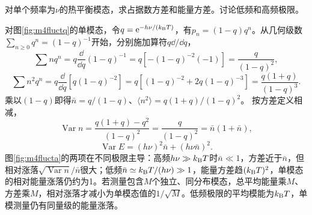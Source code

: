 \begin{example}\label{ex:m4fluctuation}
对单个频率为$\nu$的热平衡模态，求占据数方差和能量方差。讨论低频和高频极限。
\end{example}
\begin{solution}
对图\ref{fig:m4fluctq}的单模态，令$q=\mathrm e^{-h\nu/(k_{\mathrm B} T)}$，有$p_n=(1-q)q^n$。从几何级数$\sum_{n\geq0}q^n=(1-q)^{-1}$开始，分别施加算符$q\dd/\dd q$，
\[
 \sum nq^n=q\frac{\dd}{\dd q}(1-q)^{-1}
 =q[-(1-q)^{-2}(-1)]=\frac q{(1-q)^2},
\]
\[
 \sum n^2q^n=q\frac{\dd}{\dd q}[q(1-q)^{-2}]
 =q[(1-q)^{-2}+2q(1-q)^{-3}]
 =\frac{q(1+q)}{(1-q)^3}.
\]
乘以$(1-q)$即得$\bar n=q/(1-q)$、$\langle n^2\rangle=q(1+q)/(1-q)^2$。
按方差定义相减，
\[
 \operatorname{Var}n=\frac{q(1+q)-q^2}{(1-q)^2}
 =\frac q{(1-q)^2}=\bar n(1+\bar n),
\]
\[
 \operatorname{Var}E=(h\nu)^2\bar n+(h\nu\bar n)^2.
\]
图\ref{fig:m4flucta}的两项在不同极限主导：高频$h\nu\gg k_{\mathrm B} T$时$\bar n\ll1$，方差近于$\bar n$，但相对涨落$\sqrt{\operatorname{Var}n}/\bar n$很大；低频$\bar n\simeq k_{\mathrm B} T/(h\nu)\gg1$，能量方差趋$(k_{\mathrm B} T)^2$，单模态的相对能量涨落仍约为1。若测量包含$M$个独立、同分布模态，总平均能量乘$M$、方差乘$M$，相对涨落才减小为单模态值的$1/\sqrt M$。低频极限的平均模能为$k_{\mathrm B} T$，单模测量仍有同量级的能量涨落。
\end{solution}


